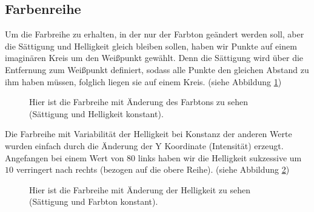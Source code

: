 \documentclass[11pt]{article}
\begin{document}
\subsection{Farbenreihe}
Um die Farbreihe zu erhalten, in der nur der Farbton geändert werden soll, aber die Sättigung und Helligkeit gleich bleiben sollen, haben wir Punkte auf einem imaginären Kreis um den Weißpunkt gewählt. Denn die Sättigung wird über die Entfernung zum Weißpunkt definiert, sodass alle Punkte den gleichen Abstand zu ihm haben müssen, folglich liegen sie auf einem Kreis. (siehe Abbildung \ref{farbton_reihe})
\begin{figure}[H]
\caption{Hier ist die Farbreihe mit Änderung des Farbtons zu sehen (Sättigung und Helligkeit konstant).}
\label{farbton_reihe}
\end{figure}


Die Farbreihe mit Variabilität der Helligkeit bei Konstanz der anderen Werte wurden einfach durch die Änderung der Y Koordinate (Intensität) erzeugt. Angefangen bei einem Wert von $80$ links haben wir die Helligkeit sukzessive um $10$ verringert nach rechts (bezogen auf die obere Reihe).  (siehe Abbildung \ref{helligkeit_reihe})
\begin{figure}[H]
\caption{Hier ist die Farbreihe mit Änderung der Helligkeit zu sehen (Sättigung und Farbton konstant).}
\label{helligkeit_reihe}
\end{figure}
\end{document}
